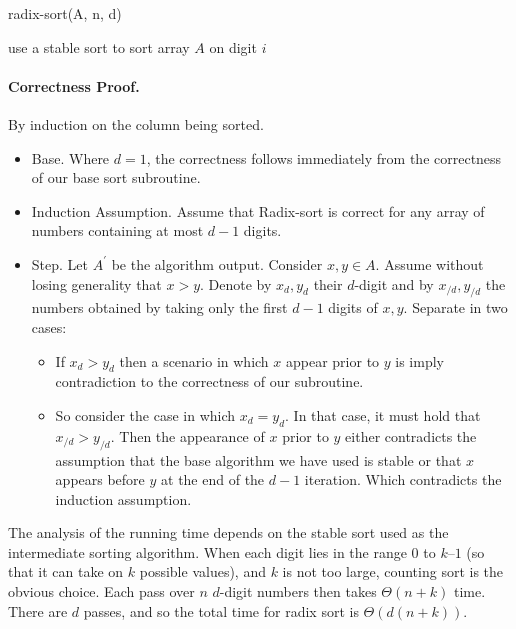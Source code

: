 \begin{algbox}{radix-sort(A, n, d)}
  \begin{algorithm}[H]
     {
        use a stable sort to sort array $A$ on digit $i$
    }
  \end{algorithm}
\end{algbox}

\paragraph{Correctness Proof.} By induction on the column being sorted.
\begin{itemize}
  \item Base. Where $d = 1$, the correctness follows immediately from the correctness of our base sort subroutine. 
  \item Induction Assumption. Assume that Radix-sort is correct for any array of numbers containing at most $d-1$ digits. 
  \item Step. Let $A^{\prime}$  be the algorithm output. Consider $x,y \in A$. Assume without losing generality that $x > y$. Denote by $x_{d}, y_{d}$ their $d$-digit and by $x_{/d}, y_{/d}$ the numbers obtained by taking only the first  $d-1$ digits of $x,y$. Separate in two cases:

    \begin{itemize}
      \item   If $x_{d} > y_{d}$ then a scenario in which $x$ appear prior to $y$ is  imply contradiction to the correctness of our subroutine.
      \item   So consider the case in which $x_{d} = y_{d}$. In that case, it must hold that $x_{/d} > y_{/d}$. Then the appearance of $x$ prior to $y$ either contradicts the assumption that the base algorithm we have used is stable or that $x$ appears before $y$ at the end of the $d-1$ iteration. Which contradicts the induction assumption. 
    \end{itemize}
 \end{itemize}

The analysis of the running time depends on the stable sort used as the intermediate sorting algorithm. When each digit lies in the range $0$ to $k – 1$ (so that it can take on $k$ possible values), and $k$ is not too large, counting sort is the obvious choice. Each pass over $n$ $d$-digit numbers then takes $\Theta(n + k)$ time. There are $d$ passes, and so the total time for radix sort is $\Theta\left(d(n + k)\right)$.

